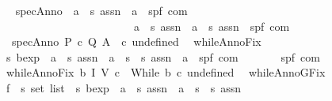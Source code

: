 \begin{isabellebody}
\ \isanewline
{}\isamarkupfalse%
\isanewline
\ \ specAnno{\isacharcolon}{\isacharcolon}\ \ {\isachardoublequoteopen}{\isacharparenleft}{\isacharprime}a\ {\isasymRightarrow}\ {\isacharprime}s\ assn{\isacharparenright}\ {\isasymRightarrow}\ {\isacharparenleft}{\isacharprime}a\ {\isasymRightarrow}\ {\isacharparenleft}{\isacharprime}s{\isacharcomma}{\isacharprime}p{\isacharcomma}{\isacharprime}f{\isacharparenright}\ com{\isacharparenright}\ {\isasymRightarrow}\ \isanewline
\ \ \ \ \ \ \ \ \ \ \ \ \ \ \ \ \ \ \ \ \ \ \ \ \ {\isacharparenleft}{\isacharprime}a\ {\isasymRightarrow}\ {\isacharprime}s\ assn{\isacharparenright}\ {\isasymRightarrow}\ {\isacharparenleft}{\isacharprime}a\ {\isasymRightarrow}\ {\isacharprime}s\ assn{\isacharparenright}\ {\isasymRightarrow}\ {\isacharparenleft}{\isacharprime}s{\isacharcomma}{\isacharprime}p{\isacharcomma}{\isacharprime}f{\isacharparenright}\ com{\isachardoublequoteclose}\isanewline
\ \ \ {\isachardoublequoteopen}specAnno\ P\ c\ Q\ A\ {\isacharequal}\ {\isacharparenleft}c\ undefined{\isacharparenright}{\isachardoublequoteclose}\isanewline
\isanewline
{}\isamarkupfalse%
\isanewline
\ \ whileAnnoFix{\isacharcolon}{\isacharcolon}\ \isanewline
\ \ {\isachardoublequoteopen}{\isacharprime}s\ bexp\ {\isasymRightarrow}\ {\isacharparenleft}{\isacharprime}a\ {\isasymRightarrow}\ {\isacharprime}s\ assn{\isacharparenright}\ {\isasymRightarrow}\ {\isacharparenleft}{\isacharprime}a\ {\isasymRightarrow}\ {\isacharparenleft}{\isacharprime}s\ {\isasymtimes}\ {\isacharprime}s{\isacharparenright}\ assn{\isacharparenright}\ {\isasymRightarrow}\ {\isacharparenleft}{\isacharprime}a\ {\isasymRightarrow}\ {\isacharparenleft}{\isacharprime}s{\isacharcomma}{\isacharprime}p{\isacharcomma}{\isacharprime}f{\isacharparenright}\ com{\isacharparenright}\ {\isasymRightarrow}\ \isanewline
\ \ \ \ \ {\isacharparenleft}{\isacharprime}s{\isacharcomma}{\isacharprime}p{\isacharcomma}{\isacharprime}f{\isacharparenright}\ com{\isachardoublequoteclose}\ \isanewline
\ \ {\isachardoublequoteopen}whileAnnoFix\ b\ I\ V\ c\ {\isacharequal}\ While\ b\ {\isacharparenleft}c\ undefined{\isacharparenright}{\isachardoublequoteclose}\isanewline
\isanewline
{}\isamarkupfalse%
\isanewline
\ \ whileAnnoGFix{\isacharcolon}{\isacharcolon}\ \isanewline
\ \ {\isachardoublequoteopen}{\isacharparenleft}{\isacharprime}f\ {\isasymtimes}\ {\isacharprime}s\ set{\isacharparenright}\ list\ {\isasymRightarrow}\ {\isacharprime}s\ bexp\ {\isasymRightarrow}\ {\isacharparenleft}{\isacharprime}a\ {\isasymRightarrow}\ {\isacharprime}s\ assn{\isacharparenright}\ {\isasymRightarrow}\ {\isacharparenleft}{\isacharprime}a\ {\isasymRightarrow}\ {\isacharparenleft}{\isacharprime}s\ {\isasymtimes}\ {\isacharprime}s{\isacharparenright}\ assn{\isacharparenright}\ {\isasymRightarrow}\ \isanewline

\end{isabellebody}
